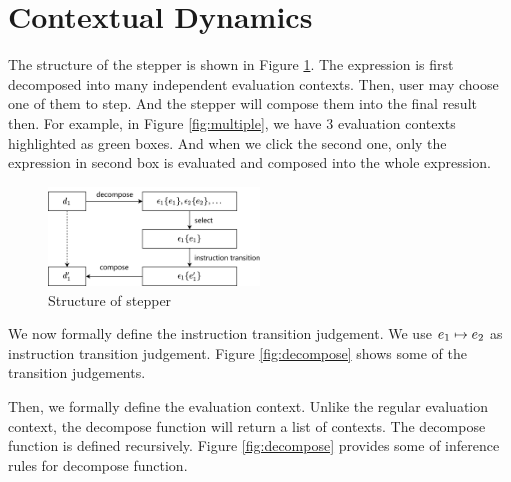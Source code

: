 \section{Contextual Dynamics}
\label{sec:condy}


The structure of the stepper is shown in Figure \ref{fig:structure}. The expression is first decomposed into many independent evaluation contexts. Then, user may choose one of them to step. And the stepper will compose them into the final result then. For example, in Figure \ref{fig:multiple}, we have 3 evaluation contexts highlighted as green boxes. And when we click the second one, only the expression in second box is evaluated and composed into the whole expression.

\begin{figure}[htbp]
  \centering
  \includegraphics[width=0.5\textwidth]{img/struct.png}
  \caption{Structure of stepper}
  \label{fig:structure}
\end{figure}

We now formally define the instruction transition judgement. We use $e_1 \mapsto e_2$ as instruction transition judgement. Figure \ref{fig:decompose} shows some of the transition judgements.


Then, we formally define the evaluation context. Unlike the regular evaluation context, the decompose function will return a list of contexts. The decompose function is defined recursively. Figure \ref{fig:decompose} provides some of inference rules for decompose function.

